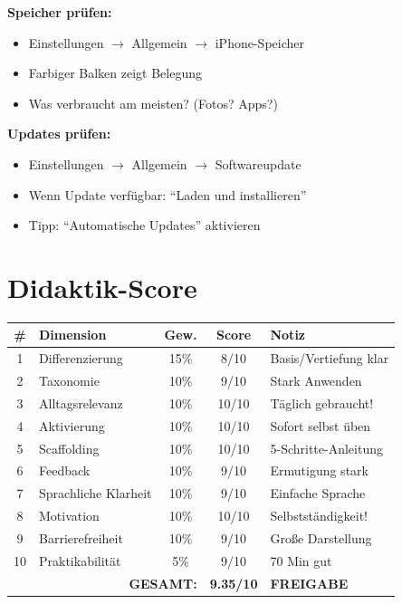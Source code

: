 \documentclass[11pt,a4paper]{article}
\begin{document}
\textbf{Speicher prüfen:}
\begin{itemize}
    \item Einstellungen $\rightarrow$ Allgemein $\rightarrow$ iPhone-Speicher
    \item Farbiger Balken zeigt Belegung
    \item Was verbraucht am meisten? (Fotos? Apps?)
\end{itemize}

\textbf{Updates prüfen:}
\begin{itemize}
    \item Einstellungen $\rightarrow$ Allgemein $\rightarrow$ Softwareupdate
    \item Wenn Update verfügbar: ``Laden und installieren''
    \item Tipp: ``Automatische Updates'' aktivieren
\end{itemize}

\section{Didaktik-Score}

\begin{scorebox}
\begin{tabular}{|c|l|c|c|p{3.5cm}|}
\hline
\# & Dimension & Gew. & Score & Notiz \\
\hline
1 & Differenzierung & 15\% & 8/10 & Basis/Vertiefung klar \\
2 & Taxonomie & 10\% & 9/10 & Stark Anwenden \\
3 & Alltagsrelevanz & 10\% & 10/10 & Täglich gebraucht! \\
4 & Aktivierung & 10\% & 10/10 & Sofort selbst üben \\
5 & Scaffolding & 10\% & 10/10 & 5-Schritte-Anleitung \\
6 & Feedback & 10\% & 9/10 & Ermutigung stark \\
7 & Sprachliche Klarheit & 10\% & 9/10 & Einfache Sprache \\
8 & Motivation & 10\% & 10/10 & Selbstständigkeit! \\
9 & Barrierefreiheit & 10\% & 9/10 & Große Darstellung \\
10 & Praktikabilität & 5\% & 9/10 & 70 Min gut \\
\hline
\multicolumn{3}{|r|}{\textbf{GESAMT:}} & \textbf{9.35/10} & \textcolor{successgreen}{\textbf{FREIGABE}} \\
\hline
\end{tabular}
\end{scorebox}
\end{document}
